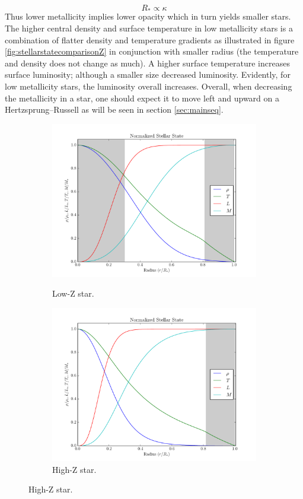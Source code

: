 \documentclass[11pt]{article}
\begin{document}
    \[ R_* \propto \kappa \]
    Thus lower metallicity implies lower opacity which in turn yields smaller stars. The higher central density and surface temperature in low metallicity stars is a combination of flatter density and temperature gradients as illustrated in figure \ref{fig:stellarstatecomparisonZ} in conjunction with smaller radius (the temperature and density does not change as much). A higher surface temperature increases surface luminosity; although a smaller size decreased luminosity. Evidently, for low metallicity stars, the luminosity overall increases. Overall, when decreasing the metallicity in a star, one should expect it to move left and upward on a Hertzsprung–Russell as will be seen in section \eqref{sec:mainseq}.
    \begin{center}
        \begin{figure}[H]
            \begin{subfigure}{.5\textwidth}
                \centering
                \caption{Low-Z star.}
                \includegraphics[width=1.1\textwidth]{figures/lowZ/stellar_state.pdf}
                \label{fig:Zstarslow}
            \end{subfigure}
            \begin{subfigure}{.5\textwidth}
                \centering
                \caption{High-Z star.}
                \includegraphics[width=1.1\textwidth]{figures/highZ/stellar_state.pdf}

\end{subfigure}
\end{figure}
\end{center}
\end{document}
